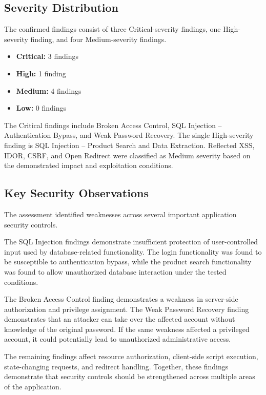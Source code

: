 \subsection*{Severity Distribution}

The confirmed findings consist of three Critical-severity findings,
one High-severity finding, and four Medium-severity findings.

\begin{itemize}
    \item \textbf{Critical:} 3 findings
    \item \textbf{High:} 1 finding
    \item \textbf{Medium:} 4 findings
    \item \textbf{Low:} 0 findings
\end{itemize}

The Critical findings include Broken Access Control, SQL Injection --
Authentication Bypass, and Weak Password Recovery. The single
High-severity finding is SQL Injection -- Product Search and Data
Extraction. Reflected XSS, IDOR, CSRF, and Open Redirect were
classified as Medium severity based on the demonstrated impact and
exploitation conditions.

\subsection*{Key Security Observations}

The assessment identified weaknesses across several important
application security controls.

The SQL Injection findings demonstrate insufficient protection of
user-controlled input used by database-related functionality. The
login functionality was found to be susceptible to authentication
bypass, while the product search functionality was found to allow
unauthorized database interaction under the tested conditions.

The Broken Access Control finding demonstrates a weakness in
server-side authorization and privilege assignment. The Weak Password
Recovery finding demonstrates that an attacker can take over the
affected account without knowledge of the original password. If the
same weakness affected a privileged account, it could potentially lead
to unauthorized administrative access.

The remaining findings affect resource authorization, client-side
script
execution, state-changing requests, and redirect handling.
Together, these findings demonstrate that security controls should be
strengthened across multiple areas of the application.

